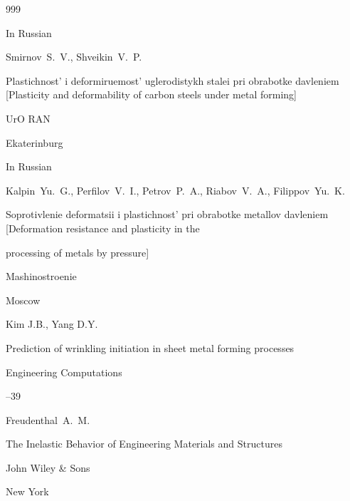 \begin{thebibliography}{999}

\lang In Russian

\by Smirnov~S.~V., Shveikin~V.~P.  

\book Plastichnost' i deformiruemost' uglerodistykh stalei pri obrabotke davleniem \rm [Plasticity and deformability of carbon steels under metal forming]


\publ UrO RAN

\publaddr Ekaterinburg




\lang In Russian

\by Kalpin~Yu.~G., Perfilov~V.~I., Petrov~P.~A., Riabov~V.~A., Filippov~Yu.~K.  

\book Soprotivlenie deformatsii i plastichnost' pri obrabotke metallov davleniem \rm [Deformation resistance and plasticity in the

processing of metals by pressure]


\publ Mashinostroenie

\publaddr Moscow







\by Kim J.B., Yang D.Y. 

\paper Prediction of wrinkling initiation in sheet metal forming processes 

\jour Engineering Computations




--39






\by Freudenthal~A.~M. 

\book The Inelastic Behavior of Engineering Materials and Structures

\publ John Wiley \& Sons

\publaddr New York






\end{thebibliography}
